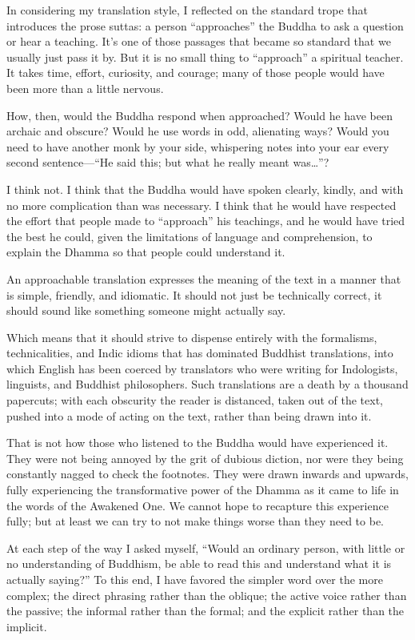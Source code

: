 \documentclass[12pt,openany]{book}%
\begin{document}
In considering my translation style, I reflected on the standard trope that introduces the prose suttas: a person “approaches” the Buddha to ask a question or hear a teaching. It’s one of those passages that became so standard that we usually just pass it by. But it is no small thing to “approach” a spiritual teacher. It takes time, effort, curiosity, and courage; many of those people would have been more than a little nervous.

How, then, would the Buddha respond when approached? Would he have been archaic and obscure? Would he use words in odd, alienating ways? Would you need to have another monk by your side, whispering notes into your ear every second sentence—“He said this; but what he really meant was…”?

I think not. I think that the Buddha would have spoken clearly, kindly, and with no more complication than was necessary. I think that he would have respected the effort that people made to “approach” his teachings, and he would have tried the best he could, given the limitations of language and comprehension, to explain the Dhamma so that people could understand it.

An approachable translation expresses the meaning of the text in a manner that is simple, friendly, and idiomatic. It should not just be technically correct, it should sound like something someone might actually say.

Which means that it should strive to dispense entirely with the formalisms, technicalities, and Indic idioms that has dominated Buddhist translations, into which English has been coerced by translators who were writing for Indologists, linguists, and Buddhist philosophers. Such translations are a death by a thousand papercuts; with each obscurity the reader is distanced, taken out of the text, pushed into a mode of acting on the text, rather than being drawn into it.

That is not how those who listened to the Buddha would have experienced it. They were not being annoyed by the grit of dubious diction, nor were they being constantly nagged to check the footnotes. They were drawn inwards and upwards, fully experiencing the transformative power of the Dhamma as it came to life in the words of the Awakened One. We cannot hope to recapture this experience fully; but at least we can try to not make things worse than they need to be.

At each step of the way I asked myself, “Would an ordinary person, with little or no understanding of Buddhism, be able to read this and understand what it is actually saying?” To this end, I have favored the simpler word over the more complex; the direct phrasing rather than the oblique; the active voice rather than the passive; the informal rather than the formal; and the explicit rather than the implicit.
\end{document}
